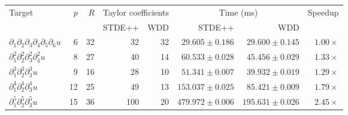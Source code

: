\begin{tabular}{@{}lrrrrrrr@{}}
    \toprule
    Target & $p$ & $R$ & \multicolumn{2}{c}{Taylor coefficients} & \multicolumn{2}{c}{Time (ms)} & Speedup \\
    \cmidrule(lr){4-5}\cmidrule(lr){6-7}
    & & & STDE++ & WDD & STDE++ & WDD & \\
    \midrule
    $\partial_1 \partial_2 \partial_3 \partial_4 \partial_5 \partial_6 u$ & 6 & 32 & 32 & 32 & $29.605 \pm 0.186$ & $29.600 \pm 0.145$ & $1.00 \times$ \\
    $\partial_1^{2} \partial_2^{2} \partial_3^{2} \partial_4^{2} u$ & 8 & 27 & 40 & 14 & $60.533 \pm 0.028$ & $45.456 \pm 0.029$ & $1.33 \times$ \\
    $\partial_1^{3} \partial_2^{3} \partial_3^{3} u$ & 9 & 16 & 28 & 10 & $51.341 \pm 0.007$ & $39.932 \pm 0.019$ & $1.29 \times$ \\
    $\partial_1^{4} \partial_2^{4} \partial_3^{4} u$ & 12 & 25 & 49 & 13 & $153.037 \pm 0.025$ & $85.421 \pm 0.009$ & $1.79 \times$ \\
    $\partial_1^{5} \partial_2^{5} \partial_3^{5} u$ & 15 & 36 & 100 & 20 & $479.972 \pm 0.006$ & $195.631 \pm 0.026$ & $2.45 \times$ \\
    \bottomrule
\end{tabular}
